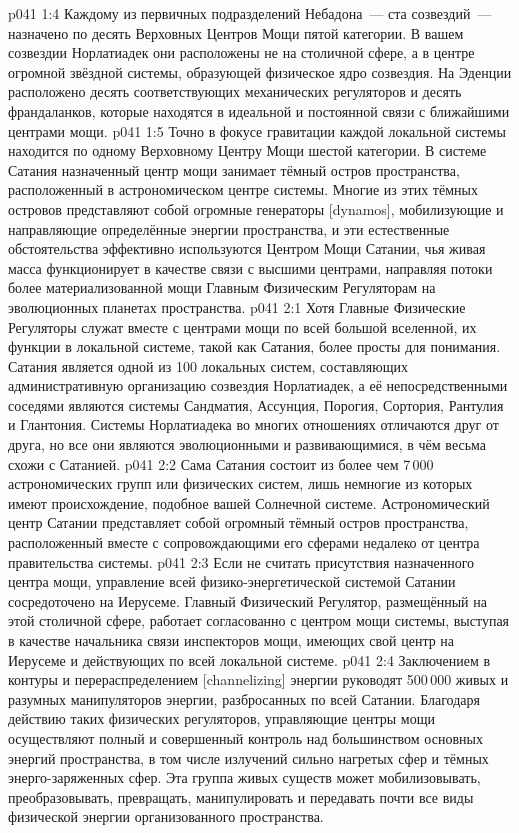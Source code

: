 \vs p041 1:4 Каждому из первичных подразделений Небадона~--- ста созвездий~--- назначено по десять Верховных Центров Мощи пятой категории. В вашем созвездии Норлатиадек они расположены не на столичной сфере, а в центре огромной звёздной системы, образующей физическое ядро созвездия. На Эденции расположено десять соответствующих механических регуляторов и десять франдаланков, которые находятся в идеальной и постоянной связи с ближайшими центрами мощи.
\vs p041 1:5 Точно в фокусе гравитации каждой локальной системы находится по одному Верховному Центру Мощи шестой категории. В системе Сатания назначенный центр мощи занимает тёмный остров пространства, расположенный в астрономическом центре системы. Многие из этих тёмных островов представляют собой огромные генераторы [dynamos], мобилизующие и направляющие определённые энергии пространства, и эти естественные обстоятельства эффективно используются Центром Мощи Сатании, чья живая масса функционирует в качестве связи с высшими центрами, направляя потоки более материализованной мощи Главным Физическим Регуляторам на эволюционных планетах пространства.
\vs p041 2:1 Хотя Главные Физические Регуляторы служат вместе с центрами мощи по всей большой вселенной, их функции в локальной системе, такой как Сатания, более просты для понимания. Сатания является одной из 100 локальных систем, составляющих административную организацию созвездия Норлатиадек, а её непосредственными соседями являются системы Сандматия, Ассунция, Порогия, Сортория, Рантулия и Глантония. Системы Норлатиадека во многих отношениях отличаются друг от друга, но все они являются эволюционными и развивающимися, в чём весьма схожи с Сатанией.
\vs p041 2:2 Сама Сатания состоит из более чем 7\,000 астрономических групп или физических систем, лишь немногие из которых имеют происхождение, подобное вашей Солнечной системе. Астрономический центр Сатании представляет собой огромный тёмный остров пространства, расположенный вместе с сопровождающими его сферами недалеко от центра правительства системы.
\vs p041 2:3 \pc Если не считать присутствия назначенного центра мощи, управление всей физико\hyp{}энергетической системой Сатании сосредоточено на Иерусеме. Главный Физический Регулятор, размещённый на этой столичной сфере, работает согласованно с центром мощи системы, выступая в качестве начальника связи инспекторов мощи, имеющих свой центр на Иерусеме и действующих по всей локальной системе.
\vs p041 2:4 Заключением в контуры и перераспределением [channelizing] энергии руководят 500\,000 живых и разумных манипуляторов энергии, разбросанных по всей Сатании. Благодаря действию таких физических регуляторов, управляющие центры мощи осуществляют полный и совершенный контроль над большинством основных энергий пространства, в том числе излучений сильно нагретых сфер и тёмных энерго\hyp{}заряженных сфер. Эта группа живых существ может мобилизовывать, преобразовывать, превращать, манипулировать и передавать почти все виды физической энергии организованного пространства.
